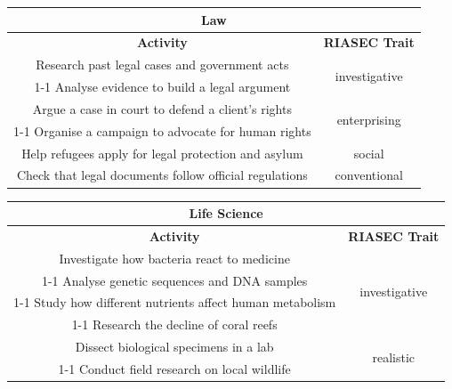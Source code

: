 \begin{table}[H]
\centering
\begin{tabular}{|c|c|}
\hline
\multicolumn{2}{|c|}{\textbf{Law}}\\
\hline
\hline
\textbf{Activity} & \textbf{RIASEC Trait}\\
\hline
Research past legal cases and government acts & \multirow{2}{*}{investigative}\\
\cline{1-1}
Analyse evidence to build a legal argument & \\
\hline
Argue a case in court to defend a client's rights & \multirow{2}{*}{enterprising}\\
\cline{1-1}
Organise a campaign to advocate for human rights & \\
\hline
Help refugees apply for legal protection and asylum & social\\
\hline
Check that legal documents follow official regulations & conventional\\
\hline
\end{tabular}
\end{table}

\begin{table}[H]
\centering
\begin{tabular}{|c|c|}
\hline
\multicolumn{2}{|c|}{\textbf{Life Science}}\\
\hline
\hline
\textbf{Activity} & \textbf{RIASEC Trait}\\
\hline
Investigate how bacteria react to medicine & \multirow{4}{*}{investigative}\\
\cline{1-1}
Analyse genetic sequences and DNA samples & \\
\cline{1-1}
Study how different nutrients affect human metabolism & \\
\cline{1-1}
Research the decline of coral reefs & \\
\hline
Dissect biological specimens in a lab & \multirow{2}{*}{realistic}\\
\cline{1-1}
Conduct field research on local wildlife & \\
\hline
\end{tabular}
\end{table}

